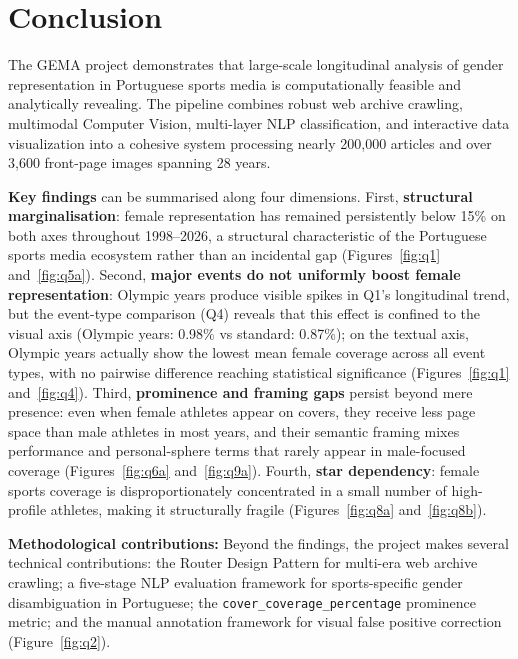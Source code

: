 \documentclass[11pt,a4paper]{article}
\begin{document}
\FloatBarrier
\section{Conclusion}
\label{sec:conclusion}

The GEMA project demonstrates that large-scale longitudinal analysis of gender representation in Portuguese sports media is computationally feasible and analytically revealing. The pipeline combines robust web archive crawling, multimodal Computer Vision, multi-layer NLP classification, and interactive data visualization into a cohesive system processing nearly 200{,}000 articles and over 3{,}600 front-page images spanning 28 years.

\textbf{Key findings} can be summarised along four dimensions. First, \textbf{structural marginalisation}: female representation has remained persistently below 15\% on both axes throughout 1998--2026, a structural characteristic of the Portuguese sports media ecosystem rather than an incidental gap (Figures~\ref{fig:q1} and~\ref{fig:q5a}). Second, \textbf{major events do not uniformly boost female representation}: Olympic years produce visible spikes in Q1's longitudinal trend, but the event-type comparison (Q4) reveals that this effect is confined to the visual axis (Olympic years: 0.98\% vs standard: 0.87\%); on the textual axis, Olympic years actually show the lowest mean female coverage across all event types, with no pairwise difference reaching statistical significance (Figures~\ref{fig:q1} and~\ref{fig:q4}). Third, \textbf{prominence and framing gaps} persist beyond mere presence: even when female athletes appear on covers, they receive less page space than male athletes in most years, and their semantic framing mixes performance and personal-sphere terms that rarely appear in male-focused coverage (Figures~\ref{fig:q6a} and~\ref{fig:q9a}). Fourth, \textbf{star dependency}: female sports coverage is disproportionately concentrated in a small number of high-profile athletes, making it structurally fragile (Figures~\ref{fig:q8a} and~\ref{fig:q8b}).

\textbf{Methodological contributions:} Beyond the findings, the project makes several technical contributions: the Router Design Pattern for multi-era web archive crawling; a five-stage NLP evaluation framework for sports-specific gender disambiguation in Portuguese; the \texttt{cover\_coverage\_percentage} prominence metric; and the manual annotation framework for visual false positive correction (Figure~\ref{fig:q2}).
\end{document}

